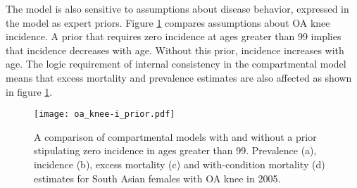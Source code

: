 The model is also sensitive to assumptions about disease behavior, expressed in the model as expert priors.  Figure \ref{fig:app-oa knee priors} compares assumptions about OA knee incidence.  A prior that requires zero incidence at ages greater than 99 implies that incidence decreases with age.  Without this prior, incidence increases with age.  The logic requirement of internal consistency in the compartmental model means that excess mortality and prevalence estimates are also affected as shown in figure \ref{fig:app-oa knee priors}.

    \begin{figure}[h]
        \begin{center}
            \texttt{[image: oa\_knee-i\_prior.pdf]}
            \caption{A comparison of compartmental models with and without a prior stipulating zero incidence in ages greater than 99.  Prevalence (a), incidence (b), excess mortality (c) and with-condition mortality (d) estimates for South Asian females with OA knee in 2005.}
            \label{fig:app-oa knee priors}
        \end{center}
    \end{figure} 